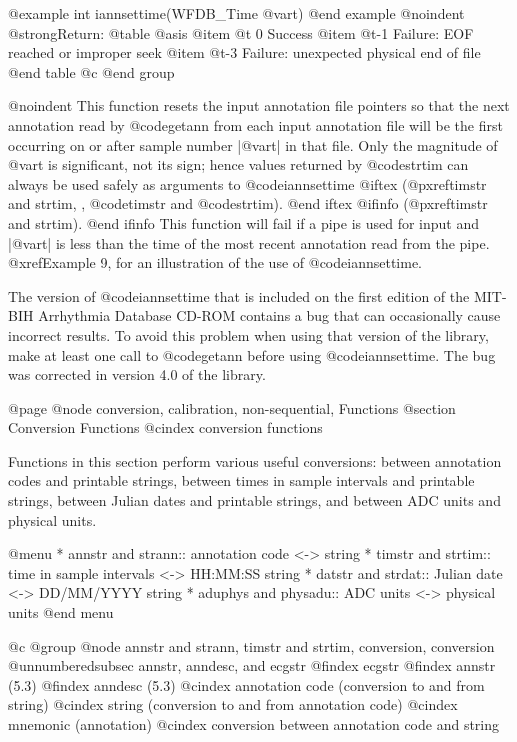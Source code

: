 {{{{{{{{{@example
int iannsettime(WFDB_Time @var{t})
@end example
@noindent
@strong{Return:}
@table @asis
@item @t{ 0}
Success
@item @t{-1}
Failure: EOF reached or improper seek
@item @t{-3}
Failure: unexpected physical end of file
@end table
@c @end group

@noindent
This function resets the input annotation file pointers so that the next
annotation read by @code{getann} from each input annotation file will be
the first occurring on or after sample number |@var{t}| in that file.
Only the magnitude of @var{t} is significant, not its sign; hence values
returned by @code{strtim} can always be used safely as arguments to
@code{iannsettime}
@iftex
(@pxref{timstr and strtim, , @code{timstr} and @code{strtim}}).
@end iftex
@ifinfo
(@pxref{timstr and strtim}).
@end ifinfo
This function will fail if a pipe is used for input and |@var{t}| is less
than the time of the most recent annotation read from the pipe.
@xref{Example 9}, for an illustration of the use of @code{iannsettime}.

The version of @code{iannsettime} that is included on the first edition
of the MIT-BIH Arrhythmia Database CD-ROM contains a bug that can
occasionally cause incorrect results.  To avoid this problem when using
that version of the library, make at least one call to @code{getann}
before using @code{iannsettime}.  The bug was corrected in version 4.0
of the library.

@page
@node     conversion, calibration, non-sequential, Functions
@section Conversion Functions
@cindex conversion functions

Functions in this section perform various useful conversions:  between
annotation codes and printable strings, between times in sample intervals
and printable strings, between Julian dates and printable strings, and between
ADC units and physical units.

@menu
* annstr and strann::		annotation code <-> string
* timstr and strtim::		time in sample intervals <-> HH:MM:SS string
* datstr and strdat::		Julian date <-> DD/MM/YYYY string
* aduphys and physadu::		ADC units <-> physical units
@end menu

@c @group
@node     annstr and strann, timstr and strtim, conversion, conversion
@unnumberedsubsec annstr, anndesc, and ecgstr
@findex ecgstr
@findex annstr (5.3)
@findex anndesc (5.3)
@cindex annotation code (conversion to and from string)
@cindex string (conversion to and from annotation code)
@cindex mnemonic (annotation)
@cindex conversion between annotation code and string

}}}}}}}}}
